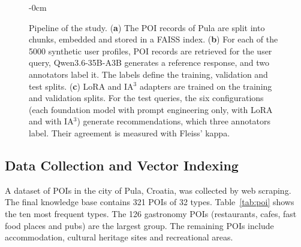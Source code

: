 \documentclass[journal,article,submit,pdftex,moreauthors]{Definitions/mdpi}
\begin{document}
\begin{figure}[H]
\begin{adjustwidth}{-\extralength}{0cm}
{}
\caption{Pipeline of the study. (\textbf{a}) The POI records of Pula are split into chunks, embedded and stored in a FAISS index. (\textbf{b}) For each of the 5000 synthetic user profiles, POI records are retrieved for the user query, Qwen3.6-35B-A3B generates a reference response, and two annotators label it. The labels define the training, validation and test splits. (\textbf{c}) LoRA and IA$^3$ adapters are trained on the training and validation splits. For the test queries, the six configurations (each foundation model with prompt engineering only, with LoRA and with IA$^3$) generate recommendations, which three annotators label. Their agreement is measured with Fleiss' kappa.\label{fig:pipeline}}
\end{adjustwidth}
\end{figure}

\subsection{Data Collection and Vector Indexing}
A dataset of POIs in the city of Pula, Croatia, was collected by web scraping. The final knowledge base contains 321 POIs of 32 types. Table~\ref{tab:poi} shows the ten most frequent types. The 126 gastronomy POIs (restaurants, cafes, fast food places and pubs) are the largest group. The remaining POIs include accommodation, cultural heritage sites and recreational areas.
\end{document}
